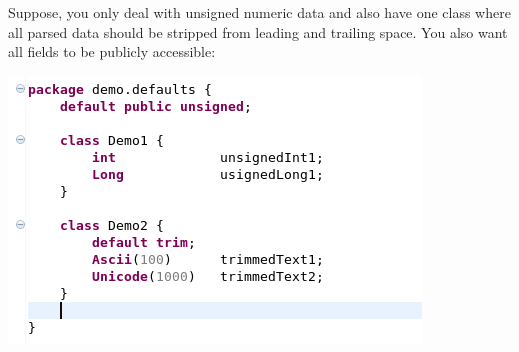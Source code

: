 \documentclass[11pt,a4paper,oneside]{article}
\begin{document}
Suppose, you only deal with unsigned numeric data and also have one class where all parsed data should be stripped from leading and trailing space.
You also want all fields to be publicly accessible:

\vspace{2mm}

\hspace{1cm}\includegraphics[scale=0.5]{images/tut1-009-defaults.png}
 
\end{document}
